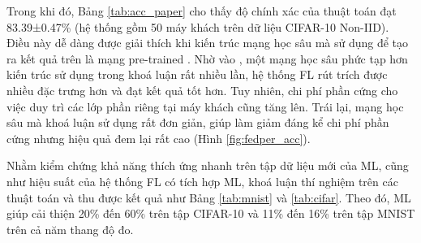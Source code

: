 Trong khi đó, Bảng \ref{tab:acc_paper} cho thấy độ chính xác của thuật toán  đạt 83.39±0.47\% (hệ thống gồm 50 máy khách trên dữ liệu CIFAR-10 Non-IID). Điều này dễ dàng được giải thích khi kiến trúc mạng học sâu mà  sử dụng để tạo ra kết quả trên là mạng pre-trained  \cite{howard2017mobilenets}. Nhờ vào , một mạng học sâu phức tạp hơn kiến trúc sử dụng trong khoá luận rất nhiều lần, hệ thống FL rút trích được nhiều đặc trưng hơn và đạt kết quả tốt hơn. Tuy nhiên, chi phí phần cứng cho việc duy trì các lớp phần riêng tại máy khách cũng tăng lên. Trái lại, mạng học sâu mà khoá luận sử dụng rất đơn giản, giúp làm giảm đáng kể chi phí phần cứng nhưng hiệu quả đem lại rất cao (Hình \ref{fig:fedper_acc}).

Nhằm kiểm chứng khả năng thích ứng nhanh trên tập dữ liệu mới của ML, cũng như hiệu suất của hệ thống FL có tích hợp ML, khoá luận thí nghiệm trên các thuật toán  và thu được kết quả như Bảng \ref{tab:mnist} và \ref{tab:cifar}. Theo đó, ML giúp cải thiện 20\% đến 60\% trên tập CIFAR-10 và 11\% đến 16\% trên tập MNIST trên cả năm thang độ đo.

